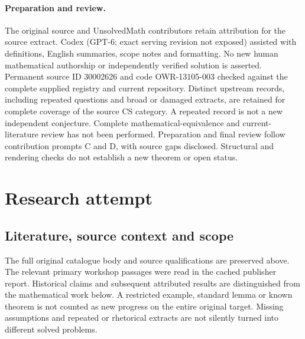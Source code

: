 \documentclass[11pt]{article}
\begin{document}
\paragraph{Preparation and review.}
The original source and UnsolvedMath contributors retain attribution for the source extract. Codex (GPT-6; exact serving revision not exposed) assisted with definitions, English summaries, scope notes and formatting. No new human mathematical authorship or independently verified solution is asserted. Permanent source ID 30002626 and code OWR-13105-003 checked against the complete supplied registry and current repository. Distinct upstream records, including repeated questions and broad or damaged extracts, are retained for complete coverage of the source CS category. A repeated record is not a new independent conjecture. Complete mathematical-equivalence and current-literature review has not been performed. Preparation and final review follow contribution prompts C and D, with source gaps disclosed. Structural and rendering checks do not establish a new theorem or open status.
\label{end:30002626}

\section{Research attempt}
\subsection{Literature, source context and scope}
The full original catalogue body and source qualifications are preserved above. The relevant primary workshop passages were read in the cached publisher report. Historical claims and subsequent attributed results are distinguished from the mathematical work below. A restricted example, standard lemma or known theorem is not counted as new progress on the entire original target. Missing assumptions and repeated or rhetorical extracts are not silently turned into different solved problems.
\end{document}
